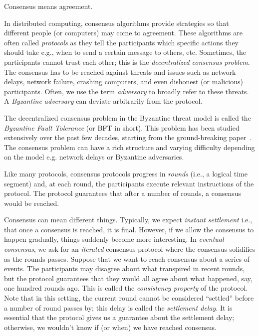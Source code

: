 




Consensus means agreement.

In distributed computing, 
consensus algorithms provide strategies 
so that different people (or computers) 
may come to agreement. 
These algorithms are often called \emph{protocols} as they 
tell the participants which specific actions they should take 
e.g., when to send a certain message to others, etc. 
Sometimes, the participants cannot trust each other; 
this is the \emph{decentralized consensus problem}. 
The consensus has to be reached against threats and issues such as 
network delays, network failure, crashing computers, and even 
dishonest (or malicious) participants. 
Often, we use the term \emph{adversary} to broadly refer to these threats. 
A \emph{Byzantine adversary} can deviate arbitrarily from the protocol. 


The decentralized consensus problem in the Byzantine threat model 
is called the \emph{Byzantine Fault Tolerance} (or BFT in short). 
This problem has been studied extensively over the past few decades, 
starting from the ground-breaking paper~\citet{BFT}. 
The consensus problem can have a rich structure and varying difficulty 
depending on the model e.g. network delays or Byzantine adversaries. 

Like many protocols, consensus protocols 
progress in \emph{rounds} 
(i.e., a logical time segment) 
and, at each round, the participants execute relevant instructions of the protocol. 
The protocol guarantees that after a number of rounds, 
a consensus would be reached. 

Consensus can mean different things. 
Typically, we expect \emph{instant settlement} 
i.e., that once a consensus is reached, 
it is final. 
However, if we allow the consensus to happen gradually, 
things suddenly become more interesting.
In \emph{eventual consensus}, 
we ask for an \emph{iterated} consensus protocol 
where the consensus solidifies as the rounds passes. 
Suppose that we want to reach consensus about a series of events. 
The participants may disagree about what transpired in recent rounds, 
but the protocol guarantees that they would all agree about 
what happened, say, one hundred rounds ago. 
This is called the \emph{consistency property} of the protocol. 
Note that in this setting, 
the current round cannot be considered ``settled'' 
before a number of round passes by; 
this delay is called the \emph{settlement delay}. 
It is essential that the protocol gives us a guarantee 
about the settlement delay;
otherwise, we wouldn't know if (or when) we have reached consensus.

